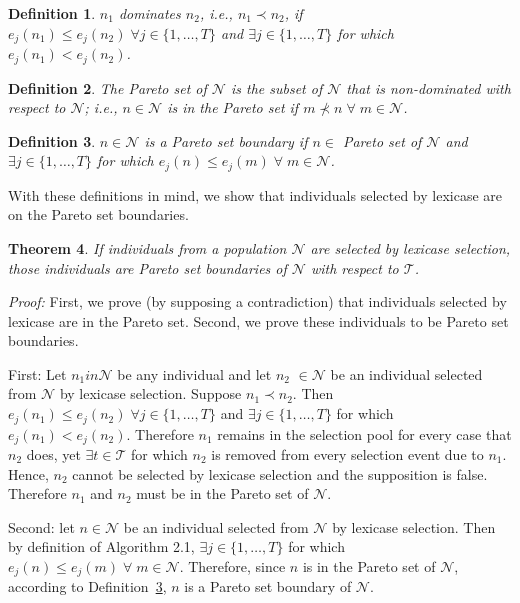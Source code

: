 \documentclass[twoside]{article}
\newtheorem{lex}{Theorem}[section]
\newtheorem{defn}[lex]{Definition}
\begin{document}
\begin{defn}\label{def:dom}
$n_1$ {\it dominates} $n_2$, i.e., ${n_1} \prec {n_2}$, if $e_j(n_1) \leq e_j(n_2) \;
\forall j  \in \{1,\dots,T\}$ and $\exists j \in \{1,\dots,T\}$ for which $e_j(n_1) < e_j(n_2)$. \bigskip
\end{defn}

\begin{defn}\label{def:pset}
The {\it Pareto set} of $\mathcal{N}$ is the subset of $\mathcal{N}$ that is non-dominated with respect to $\mathcal{N}$; i.e., $n \in \mathcal{N}$ is in the Pareto set if $m \nprec n \; \forall \; m \in \mathcal{N}$. 
\end{defn}

\begin{defn}\label{def:boundary}
$n \in \mathcal{N}$ is a {\it Pareto set boundary} if $n \in$ Pareto set of $\mathcal{N}$ and $\exists j \in \{1,\dots,T\}$ for which $e_j(n) \leq e_j(m) \; \forall \; m \in \mathcal{N}$. 
\end{defn}

With these definitions in mind, we show that individuals selected by lexicase are on the Pareto set boundaries. 

\begin{lex}\label{thm:lex}
If individuals from a population $\mathcal{N}$ are selected by lexicase selection, those individuals are Pareto set boundaries of $\mathcal{N}$ with respect to $\mathcal{T}$. 
\end{lex}

\noindent \textit{Proof:} First, we prove (by supposing a contradiction) that individuals selected by lexicase are in the Pareto set. Second, we prove these individuals to be Pareto set boundaries. 

First:  Let $n_1 in \mathcal{N}$ be any individual and let $n_2$ $\in \mathcal{N}$ be an individual selected from $\mathcal{N}$ by lexicase selection. Suppose $n_1 \prec n_2$. Then $e_j(n_1) \leq e_j(n_2) \;
\forall j  \in \{1,\dots,T\}$ and $\exists j \in \{1,\dots,T\}$ for which $e_j(n_1) < e_j(n_2)$. Therefore $n_1$ remains in the selection pool for every case that $n_2$ does, yet $\exists t \in \mathcal{T}$ for which $n_2$ is removed from every selection event due to $n_1$. Hence, $n_2$ cannot be selected by lexicase selection and the supposition is false. Therefore $n_1$ and $n_2$ must be in the Pareto set of $\mathcal{N}$. 

Second: let $n \in \mathcal{N}$ be an individual selected from $\mathcal{N}$ by lexicase selection. Then by definition of Algorithm 2.1, $\exists j \in \{1,\dots,T\}$ for which $e_j(n) \leq e_j(m) \; \forall \; m \in \mathcal{N}$. Therefore, since $n$ is in the Pareto set of $\mathcal{N}$, according to Definition~\ref{def:boundary}, $n$ is a Pareto set boundary of $\mathcal{N}$.  
\bigskip
\end{document}
